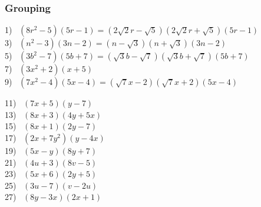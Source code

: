 \documentclass[11pt]{book}
\newcommand{\tmstrong}[1]{\textbf{#1}}
\theoremstyle{definition}  %
\begin{document}

\subsubsection{Grouping}


  1)~ $(8r^2-5)(5r-1)=\left(2\sqrt{2}r-\sqrt{5}\right)\left(2\sqrt{2}r+\sqrt{5}\right)(5r-1)$\\
  3)~ $(n^2-3)(3n-2)=\left(n-\sqrt{3}\right)\left(n+\sqrt{3}\right)(3n-2)$\\
  5)~ $(3b^2-7)(5b+7)=\left(\sqrt{3}b-\sqrt{7}\right)\left(\sqrt{3}b+\sqrt{7}\right)(5b+7)$\\
  7)~ $(3x^2+2)(x+5)$\\
  9)~ $(7x^2-4)(5x-4)=\left(\sqrt{7}x-2\right)\left(\sqrt{7}x+2\right)(5x-4)$%
\begin{multicols}{2}
  11)~ $(7x+5)(y-7)$\\
  13)~ $(8x+3)(4y+5x)$\\
  15)~ $(8x+1)(2y-7)$\\
  17)~ $(2x+7y^2)(y-4x)$\\
  19)~ $(5x-y)(8y+7)$\\
  21)~ $(4u+3)(8v-5)$\\
  23)~ $(5x+6)(2y+5)$\\
  25)~ $(3u-7)(v-2u)$\\
  27)~ $(8y-3x)(2x+1)$%
\end{multicols}
\end{document}
